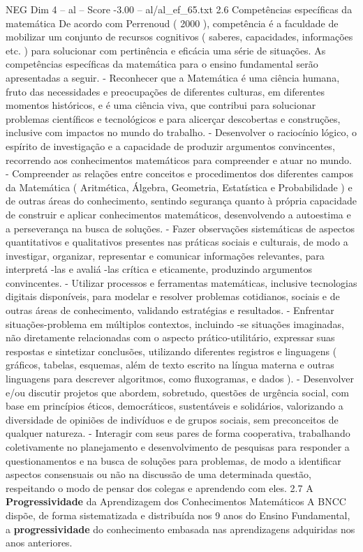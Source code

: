 \begin{textsample}{NEG Dim 4 – al – Score -3.00 – al/al\_ef\_65.txt}  \label{ex:f4_neg_242}
2.6 Competências específicas da matemática De acordo com Perrenoud ( 2000 ), competência é a faculdade de mobilizar um conjunto de recursos cognitivos ( saberes, capacidades, informações etc. ) para solucionar com pertinência e eficácia uma série de situações.
As competências específicas da matemática para o ensino fundamental serão apresentadas a seguir. - Reconhecer que a Matemática é uma ciência humana, fruto das necessidades e preocupações de diferentes culturas, em diferentes momentos históricos, e é uma ciência viva, que contribui para solucionar problemas científicos e tecnológicos e para alicerçar descobertas e construções, inclusive com impactos no mundo do trabalho. - Desenvolver o raciocínio lógico, o espírito de investigação e a capacidade de produzir argumentos convincentes, recorrendo aos conhecimentos matemáticos para compreender e atuar no mundo. - Compreender as relações entre conceitos e procedimentos dos diferentes campos da Matemática ( Aritmética, Álgebra, Geometria, Estatística e Probabilidade ) e de outras áreas do conhecimento, sentindo segurança quanto à própria capacidade de construir e aplicar conhecimentos matemáticos, desenvolvendo a autoestima e a perseverança na busca de soluções. - Fazer observações sistemáticas de aspectos quantitativos e qualitativos presentes nas práticas sociais e culturais, de modo a investigar, organizar, representar e comunicar informações relevantes, para interpretá -las e avaliá -las crítica e eticamente, produzindo argumentos convincentes. - Utilizar processos e ferramentas matemáticas, inclusive tecnologias digitais disponíveis, para modelar e resolver problemas cotidianos, sociais e de outras áreas de conhecimento, validando estratégias e resultados. - Enfrentar situações-problema em múltiplos contextos, incluindo -se situações imaginadas, não diretamente relacionadas com o aspecto prático-utilitário, expressar suas respostas e sintetizar conclusões, utilizando diferentes registros e linguagens ( gráficos, tabelas, esquemas, além de texto escrito na língua materna e outras linguagens para descrever algoritmos, como fluxogramas, e dados ). - Desenvolver e/ou discutir projetos que abordem, sobretudo, questões de urgência social, com base em princípios éticos, democráticos, sustentáveis e solidários, valorizando a diversidade de opiniões de indivíduos e de grupos sociais, sem preconceitos de qualquer natureza. - Interagir com seus pares de forma cooperativa, trabalhando coletivamente no planejamento e desenvolvimento de pesquisas para responder a questionamentos e na busca de soluções para problemas, de modo a identificar aspectos consensuais ou não na discussão de uma determinada questão, respeitando o modo de pensar dos colegas e aprendendo com eles. 2.7 A \textbf{Progressividade} da Aprendizagem dos Conhecimentos Matemáticos A BNCC dispõe, de forma sistematizada e distribuída nos 9 anos do Ensino Fundamental, a \textbf{progressividade} do conhecimento embasada nas aprendizagens adquiridas nos anos anteriores.

\end{textsample}
